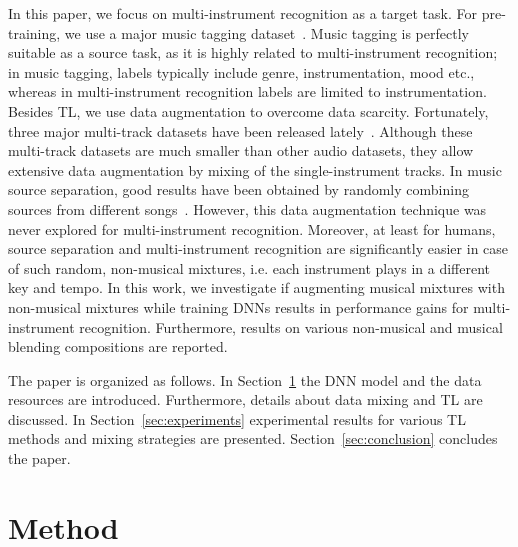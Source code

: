 \documentclass{article}
\begin{document}
In this paper, we focus on multi-instrument recognition as a target task. For pre-training, we use a major music tagging dataset~\cite{bogdanov2019jamendo}. Music tagging is perfectly suitable as a source task, as it is highly related to multi-instrument recognition; in music tagging, labels typically include genre, instrumentation, mood etc., whereas in multi-instrument recognition labels are limited to instrumentation. Besides TL, we use data augmentation to overcome data scarcity. Fortunately, three major multi-track datasets have been released lately~\cite{bittner2014medleydb, gururani2017mixingsecrets, manilow2019slakh}. Although these multi-track datasets are much smaller than other audio datasets, they allow extensive data augmentation by mixing of the single-instrument tracks. In music source separation, good results have been obtained by randomly combining sources from different songs~\cite{uhlich2017improving}. However, this data augmentation technique was never explored for multi-instrument recognition. Moreover, at least for humans, source separation and multi-instrument recognition are significantly easier in case of such random, non-musical mixtures, i.e. each instrument plays in a different key and tempo. In this work, we investigate if augmenting musical mixtures with non-musical mixtures while training DNNs results in performance gains for multi-instrument recognition. Furthermore, results on various non-musical and musical blending compositions are reported.

The paper is organized as follows. In Section~\ref{sec:method} the DNN model and the data resources are introduced. Furthermore, details about data mixing and TL are discussed. In Section~\ref{sec:experiments} experimental results for various TL methods and mixing strategies are presented. Section~\ref{sec:conclusion} concludes the paper.

\section{Method}
\label{sec:method}
\end{document}
